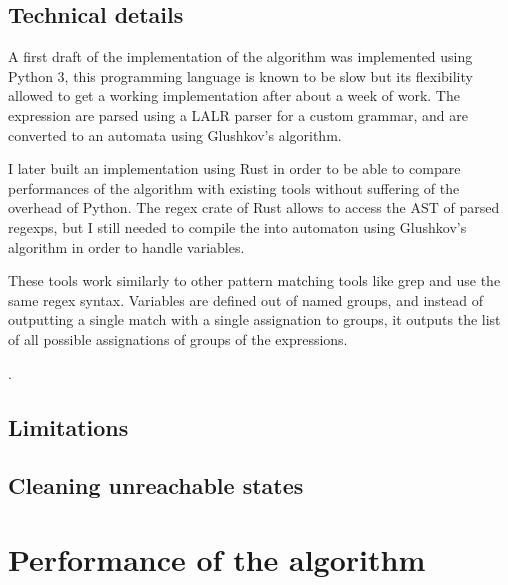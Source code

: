 \documentclass[12px]{article}
\begin{document}

    \subsection{Technical details}


      A first draft of the implementation of the algorithm was implemented
      using Python 3, this programming language is known to be slow but its
      flexibility allowed to get a working implementation after about a week of
      work. The expression are parsed using a LALR parser for a custom grammar,
      and are converted to an automata using Glushkov's algorithm.

      I later built an implementation using Rust in order to be able to compare
      performances of the algorithm with existing tools without suffering of
      the overhead of Python. The regex crate of Rust allows to access the
      AST of parsed regexps, but I still needed to compile the into automaton
      using Glushkov's algorithm in order to handle variables.

      These tools work similarly to other pattern matching tools like grep and
      use the same regex syntax. Variables are defined out of named groups, and
      instead of outputting a single match with a single assignation to groups,
      it outputs the list of all possible assignations of groups of the
      expressions.

      .

    \subsection{Limitations}


    \subsection{Cleaning unreachable states}


  \section{Performance of the algorithm}
\end{document}

